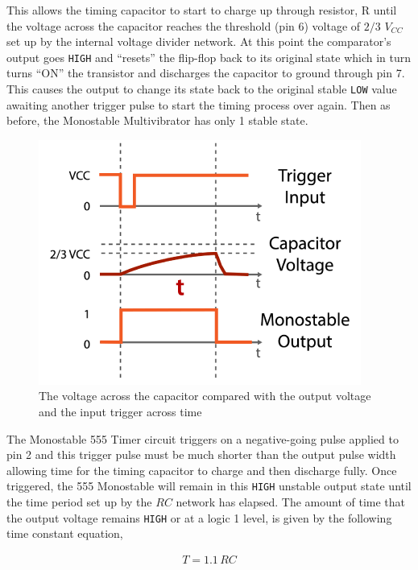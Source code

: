 This allows the timing capacitor to start to charge up through resistor, R until the voltage across the capacitor reaches the threshold (pin 6) voltage of $2/3$ $V_{CC}$ set up by the internal voltage divider network. At this point the comparator's output goes \verb|HIGH| and “resets” the flip-flop back to its original state which in turn turns “ON” the transistor and discharges the capacitor to ground through pin 7. This causes the output to change its state back to the original stable \verb|LOW| value awaiting another trigger pulse to start the timing process over again. Then as before, the Monostable Multivibrator has only 1 stable state.

\begin{figure}[H]
    \centering
    \includegraphics[width=0.6\columnwidth]{images/mono1.png}
    \caption{The voltage across the capacitor compared with the output voltage and the input trigger across time}
    \label{mono1}
\end{figure}

The Monostable 555 Timer circuit triggers on a negative-going pulse applied to pin 2 and this trigger pulse must be much shorter than the output pulse width allowing time for the timing capacitor to charge and then discharge fully. Once triggered, the 555 Monostable will remain in this \verb|HIGH| unstable output state until the time period set up by the $R C$ network has elapsed. The amount of time that the output voltage remains \verb|HIGH| or at a logic 1 level, is given by the following time constant equation,

\begin{align}
    T=1.1\,RC
\end{align}

